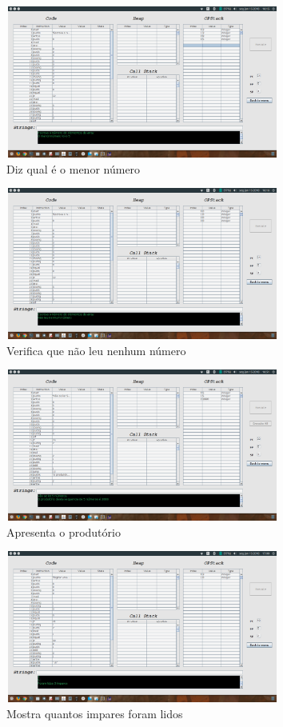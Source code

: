 \documentclass{report}
\begin{document}
\begin{figure}[h]
	\centering
	\includegraphics[width=9cm,height= 5cm]{exemplo2-1.png}
	\caption{Diz qual é o menor número}
	\label{Exemplo 2.1}
\end{figure}

\begin{figure}[h]
	\centering
	\includegraphics[width=9cm,height= 5cm]{exemplo2-2.png}
	\caption{Verifica que não leu nenhum número}
	\label{Exemplo 2.2}
\end{figure}

\begin{figure}[h]
	\centering
	\includegraphics[width=9cm,height= 5cm]{exemplo3-1.png}
	\caption{Apresenta o produtório}
	\label{Exemplo 3.1}
\end{figure}

\begin{figure}[h]
	\centering
	\includegraphics[width=9cm,height= 5cm]{exemplo4-1.png}
	\caption{Mostra quantos impares foram lidos}
	\label{Exemplo 4.1}
\end{figure}
\end{document}
